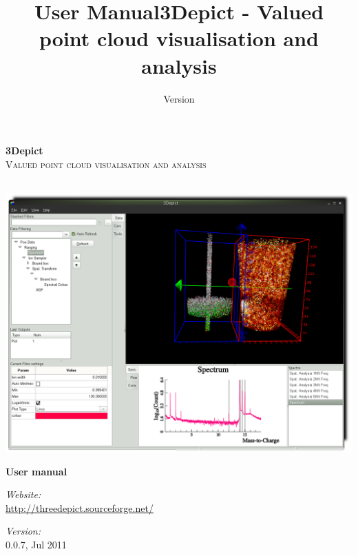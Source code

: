 \documentclass[10pt]{article}
\title{User Manual}
\date{Version}
\author{}
\begin{document}
\begin{titlepage}

\begin{center}
\vspace{3 cm}
\Huge \textbf{3Depict}\\[1.0cm]

\textsc{\Large Valued point cloud visualisation and analysis}\\
\hrulefill \\[1.0cm]

\begin{center}
 \includegraphics[width=\textwidth,keepaspectratio=true]{./figures/CoverImage.png}
\end{center}
\vspace{1.0 cm}


{ \Huge \bfseries User manual}\\[0.4cm]
\vspace{1.0 cm}


\begin{minipage}{0.5\textwidth}
\begin{flushleft} \large
\emph{Website:}\\
\url{http://threedepict.sourceforge.net/}\end{flushleft}
\end{minipage}
\begin{minipage}{0.3\textwidth}
\begin{flushright} \large
\emph{Version:} \\
 0.0.7, Jul 2011\end{flushright}
\end{minipage}

\vfill

\end{center}

\end{titlepage}
\clearpage
{}
\tableofcontents
\clearpage
{}
\title{3Depict - Valued point cloud visualisation and analysis}
\end{document}

